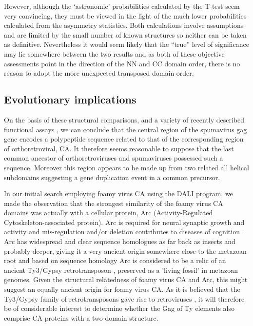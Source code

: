 \documentclass[preprint,12pt]{elsarticle}
\begin{document}
However, although the ‘astronomic’ probabilities calculated by the T-test seem very convincing, they
must be viewed in the light of the much lower probabilities calculated from the asymmetry statistics.
Both calculations involve assumptions and are limited by the small number of known structures so neither
can be taken as definitive. Nevertheless it would seem likely that the “true” level of significance may
lie somewhere between the two results and as both of these objective assessments point in the direction
of the NN and CC domain order, there is no reason to adopt the more unexpected transposed domain order.


\subsection{Evolutionary implications}

On the basis of these structural comparisons, and a variety of recently described functional assays \cite{BallNJet16}, 
we can conclude that the central region of the spumavirus gag gene encodes a polypeptide sequence related to that of 
the corresponding region of orthoretroviral, CA. It therefore seems reasonable to suppose that the last 
common ancestor of orthoretroviruses and spumaviruses possessed such a sequence. Moreover this region appears 
to be made up from two related all helical subdomains suggesting a gene duplication event in a common precursor. 

In our initial search employing foamy virus CA using the DALI program, we made the observation that the strongest
similarity of the foamy virus CA domains was actually with a cellular protein, Arc (Activity-Regulated
Cytoskeleton-associated protein).  Arc is required for neural synaptic growth and activity
\cite{ChowdhurySet06,ParkSet08,ShepherdJDet06,WaungMWet08} and mis-regulation and/or deletion contributes
to diseases of cognition \cite{NiereFet12,ParkSet08,WaungMWet08}.  Arc has widespread and clear sequence
homologues as far back as insects and probably deeper, giving it a very ancient origin somewhere close to the
metazoan root \cite{CampillosMet06,VolffJN09} and based on sequence homology Arc is considered to be a relic
of an ancient Ty3/Gypsy retrotransposon \cite{ZhangWet15}, preserved as a ’living fossil’ in metazoan genomes.
Given the structural relatedness of foamy virus CA and Arc, this might suggest an equally ancient origin for
foamy virus CA. As it is believed that the Ty3/Gypsy family of retrotransposons gave rise to retroviruses
\cite{LlorensCet08}, it will therefore be of considerable interest to determine whether the Gag of Ty elements
also comprise CA proteins with a two-domain structure.
\end{document}
